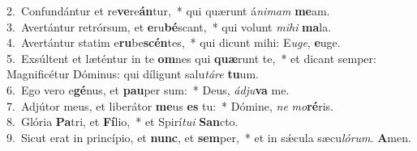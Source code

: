 {2.~}Confundántur et re\textbf{ve}re\textbf{án}tur,~* qui quærunt á\textit{ni}\textit{mam} \textbf{me}am.\\
{3.~}Avertántur retrórsum, et \textbf{e}ru\textbf{bé}scant,~* qui volunt \textit{mi}\textit{hi} \textbf{ma}la.\\
{4.~}Avertántur statim e\textbf{ru}be\textbf{scén}tes,~* qui dicunt mihi: E\textit{u}\textit{ge}, \textbf{e}uge.\\
{5.~}Exsúltent et læténtur in te \textbf{om}nes qui \textbf{quæ}runt te,~* et dicant semper: Magnificétur Dóminus: qui díligunt salu\textit{tá}\textit{re} \textbf{tu}um.\\
{6.~}Ego vero e\textbf{gé}nus, et \textbf{pau}per sum:~* Deus, \textit{ád}\textit{ju}\textbf{va} me.\\
{7.~}Adjútor meus, et liberátor \textbf{me}us \textbf{es} tu:~* Dómine, \textit{ne} \textit{mo}\textbf{ré}ris.\\
{8.~}Glória \textbf{Pa}tri, et \textbf{Fí}lio,~* et Spirí\textit{tu}\textit{i} \textbf{San}cto.\\
{9.~}Sicut erat in princípio, et \textbf{nunc}, et \textbf{sem}per,~* et in sǽcula sæcu\textit{ló}\textit{rum}. \textbf{A}men.\\
